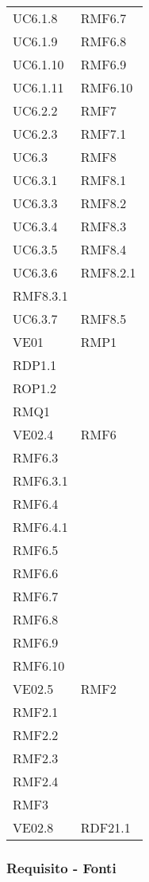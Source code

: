 \begin{longtable}[h!] { >{\centering}m{5cm} >{\centering}m{5cm} }
	 UC6.1.8 & RMF6.7
	 \tabularnewline
	 UC6.1.9 & RMF6.8
	 \tabularnewline
	 UC6.1.10 & RMF6.9
	 \tabularnewline
	 UC6.1.11 & RMF6.10
	 \tabularnewline
	 UC6.2.2 & RMF7
	 \tabularnewline
	 UC6.2.3 & RMF7.1
	 \tabularnewline
	 UC6.3 & RMF8
	 \tabularnewline
	 UC6.3.1 & RMF8.1
	 \tabularnewline
	 UC6.3.3 & RMF8.2
	 \tabularnewline
	 UC6.3.4 & RMF8.3
	 \tabularnewline
	 UC6.3.5 & RMF8.4
	 \tabularnewline
	 UC6.3.6 & RMF8.2.1 \\ 
	 RMF8.3.1 
	 \tabularnewline
	 UC6.3.7 & RMF8.5
	 \tabularnewline
	 VE01 & RMP1 \\
	 RDP1.1 \\
	 ROP1.2 \\
	 RMQ1
	 \tabularnewline
	 VE02.4 & RMF6\\
	 RMF6.3 \\
	 RMF6.3.1 \\
	 RMF6.4 \\
	 RMF6.4.1 \\
	 RMF6.5 \\
	 RMF6.6 \\
	 RMF6.7 \\
	 RMF6.8 \\
	 RMF6.9 \\
	 RMF6.10 
	 \tabularnewline
	 VE02.5 & RMF2 \\
	 RMF2.1 \\
	 RMF2.2 \\
	 RMF2.3 \\
	 RMF2.4 \\
	 RMF3
	 \tabularnewline
	 VE02.8 & RDF21.1
	 \tabularnewline
	
\end{longtable}

\newpage

\subsubsection{Requisito - Fonti}

